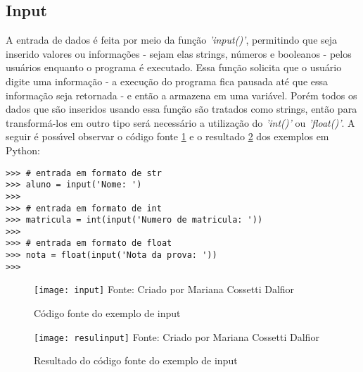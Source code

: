 \subsection{Input}

A entrada de dados \'{e} feita por meio da fun\c{c}\~{a}o \textsl{'input()'}, permitindo que seja inserido valores ou informa\c{c}\~{o}es - sejam elas strings, n\'{u}meros e  booleanos - pelos usu\'{a}rios enquanto o programa \'{e} executado. Essa fun\c{c}\~{a}o solicita que o usu\'{a}rio digite uma informa\c{c}\~{a}o - a execu\c{c}\~{a}o do programa fica pausada at\'{e} que essa informa\c{c}\~{a}o seja retornada - e ent\~{a}o a armazena em uma vari\'{a}vel. Por\'{e}m todos os dados que s\~{a}o inseridos usando essa fun\c{c}\~{a}o s\~{a}o tratados como strings, ent\~{a}o para transform\'{a}-los em outro tipo ser\'{a} necess\'{a}rio a utiliza\c{c}\~{a}o do \textsl{'int()'} ou \textsl{'float()'}. A seguir \'{e} poss\'{\i}vel observar o c\'{o}digo fonte \ref{fonteinput} e o resultado \ref{resulinput} dos exemplos em Python:

\begin{lstlisting}
>>> # entrada em formato de str
>>> aluno = input('Nome: ')
>>>
>>> # entrada em formato de int
>>> matricula = int(input('Numero de matricula: '))
>>>
>>> # entrada em formato de float
>>> nota = float(input('Nota da prova: '))
>>>
\end{lstlisting}

\begin{figure}[H]
	\begin{center}
		\caption{C\'{o}digo fonte do exemplo de input} \label{fonteinput}
		\texttt{[image: input]} 
		\newline
		Fonte: Criado por Mariana Cossetti Dalfior
	\end{center}
\end{figure}

\begin{figure}[H]
	\begin{center}
		\caption{Resultado do c\'{o}digo fonte do exemplo de input} \label{resulinput}
		\texttt{[image: resulinput]} 
		\newline
		Fonte: Criado por Mariana Cossetti Dalfior
	\end{center}
\end{figure}

